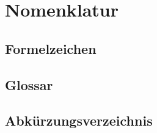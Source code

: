 \section{Nomenklatur}
\subsection{Formelzeichen}
\subsection{Glossar}
\subsection{Abkürzungsverzeichnis}
